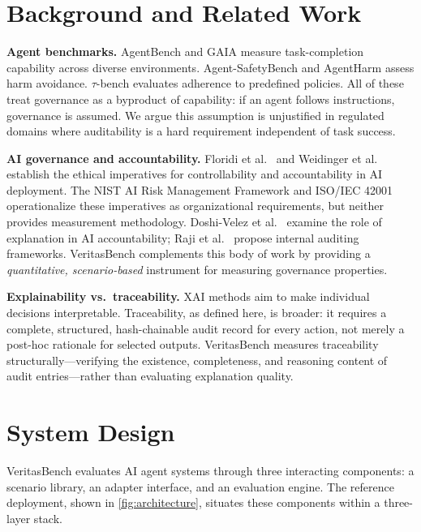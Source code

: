\documentclass{article}
\begin{document}
\section{Background and Related Work}
\label{sec:background}

\textbf{Agent benchmarks.} AgentBench \cite{liu2023agentbench} and GAIA
\cite{mialon2023gaia} measure task-completion capability across diverse
environments. Agent-SafetyBench \cite{zhang2024agentsafetybench} and AgentHarm
\cite{liao2024agentharm} assess harm avoidance. $\tau$-bench
\cite{yao2024taubench} evaluates adherence to predefined policies. All of these
treat governance as a byproduct of capability: if an agent follows instructions,
governance is assumed. We argue this assumption is unjustified in regulated
domains where auditability is a hard requirement independent of task success.

\textbf{AI governance and accountability.} Floridi et al.\
\cite{floridi2018ai4people} and Weidinger et al.\ \cite{weidinger2021ethical}
establish the ethical imperatives for controllability and accountability in AI
deployment. The NIST AI Risk Management Framework \cite{nist2023airmf} and
ISO/IEC 42001 \cite{iso42001} operationalize these imperatives as organizational
requirements, but neither provides measurement methodology. Doshi-Velez et al.\
\cite{doshi2017accountability} examine the role of explanation in AI
accountability; Raji et al.\ \cite{raji2020closing} propose internal auditing
frameworks. VeritasBench complements this body of work by providing a
\emph{quantitative, scenario-based} instrument for measuring governance
properties.

\textbf{Explainability vs.\ traceability.} XAI methods \cite{ali2023xai} aim
to make individual decisions interpretable. Traceability, as defined here, is
broader: it requires a complete, structured, hash-chainable audit record for
every action, not merely a post-hoc rationale for selected outputs. VeritasBench
measures traceability structurally---verifying the existence, completeness, and
reasoning content of audit entries---rather than evaluating explanation quality.

\section{System Design}
\label{sec:design}

VeritasBench evaluates AI agent systems through three interacting components:
a scenario library, an adapter interface, and an evaluation engine. The
reference deployment, shown in \cref{fig:architecture}, situates these
components within a three-layer stack.
\end{document}
